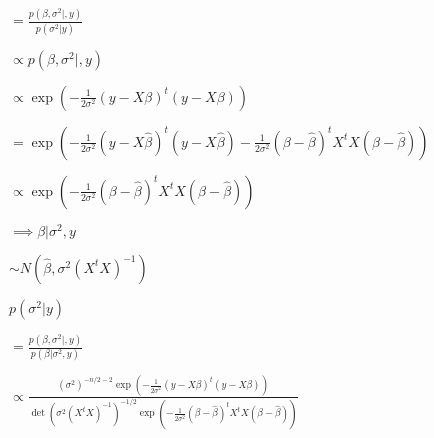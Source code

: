 \documentclass[english]{article}
\theoremstyle{plain}
\def\lthtmlcheckvsize{\ifdim\ht\sizebox<\vsize 
  \ifdim\wd\sizebox<\hsize\expandafter\hfill\fi \expandafter\vfill
  \else\expandafter\vss\fi}%
\begin{document}
{\newpage\clearpage
{}%
$\displaystyle =\frac{p\left(\beta,\sigma^{2}|,y\right)}{p\left(\sigma^{2}|y\right)}$%
\lthtmlindisplaymathZ
\lthtmlcheckvsize\clearpage}

{\newpage\clearpage
{}%
$\displaystyle \propto p\left(\beta,\sigma^{2}|,y\right)$%
\lthtmlindisplaymathZ
\lthtmlcheckvsize\clearpage}

{\newpage\clearpage
{}%
$\displaystyle \propto\exp\left(-\frac{1}{2\sigma^{2}}\left(y-X\beta\right)^{t}\left(y-X\beta\right)\right)$%
\lthtmlindisplaymathZ
\lthtmlcheckvsize\clearpage}

{\newpage\clearpage
{}%
$\displaystyle =\exp\left(-\frac{1}{2\sigma^{2}}\left(y-X\hat{\beta}\right)^{t}\left(y-X\hat{\beta}\right)-\frac{1}{2\sigma^{2}}\left(\beta-\hat{\beta}\right)^{t}X^{t}X\left(\beta-\hat{\beta}\right)\right)$%
\lthtmlindisplaymathZ
\lthtmlcheckvsize\clearpage}

{\newpage\clearpage
{}%
$\displaystyle \propto\exp\left(-\frac{1}{2\sigma^{2}}\left(\beta-\hat{\beta}\right)^{t}X^{t}X\left(\beta-\hat{\beta}\right)\right)$%
\lthtmlindisplaymathZ
\lthtmlcheckvsize\clearpage}

{\newpage\clearpage
{}%
$\displaystyle \implies\beta|\sigma^{2},y$%
\lthtmlindisplaymathZ
\lthtmlcheckvsize\clearpage}

{\newpage\clearpage
{}%
$\displaystyle \sim N\left(\hat{\beta},\sigma^{2}\left(X^{t}X\right)^{-1}\right)$%
\lthtmlindisplaymathZ
\lthtmlcheckvsize\clearpage}

{\newpage\clearpage
{}%
$\displaystyle p\left(\sigma^{2}|y\right)$%
\lthtmlindisplaymathZ
\lthtmlcheckvsize\clearpage}

{\newpage\clearpage
{}%
$\displaystyle =\frac{p\left(\beta,\sigma^{2}|,y\right)}{p\left(\beta|\sigma^{2},y\right)}$%
\lthtmlindisplaymathZ
\lthtmlcheckvsize\clearpage}

{\newpage\clearpage
{}%
$\displaystyle \propto\frac{\left(\sigma^{2}\right)^{-n/2-2}\exp\left(-\frac{1}{2\sigma^{2}}\left(y-X\beta\right)^{t}\left(y-X\beta\right)\right)}{\det\left(\sigma^{2}\left(X^{t}X\right)^{-1}\right)^{-1/2}\exp\left(-\frac{1}{2\sigma^{2}}\left(\beta-\hat{\beta}\right)^{t}X^{t}X\left(\beta-\hat{\beta}\right)\right)}$%
\lthtmlindisplaymathZ
\lthtmlcheckvsize\clearpage}
\end{document}
